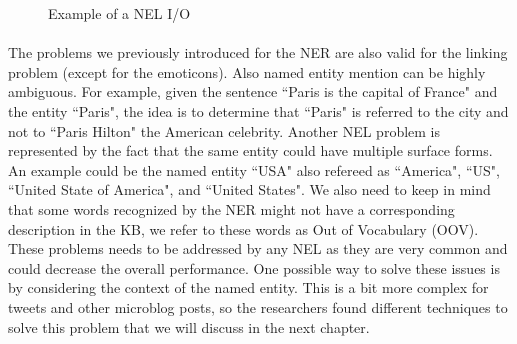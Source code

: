 \begin{figure}[ht]
\caption{Example of a NEL I/O}
\label{fig:nel_io}
\end{figure}

\paragraph{}
The problems we previously introduced for the NER are also valid for the linking problem (except for the emoticons). Also named entity mention can be highly ambiguous. For example, given the sentence ``Paris is the capital of France" and the entity ``Paris", the idea is to determine that ``Paris" is referred to the city and not to ``Paris Hilton" the American celebrity. Another NEL problem is represented by the fact that the same entity could have multiple surface forms. An example could be the named entity ``USA" also refereed as ``America", ``US", ``United State of America", and ``United States". We also need to keep in mind that some words recognized by the NER might not have a corresponding description in the KB, we refer to these words as Out of Vocabulary (OOV). These problems needs to be addressed by any NEL as they are very common and could decrease the overall performance. One possible way to solve these issues is by considering the context of the named entity. This is a bit more complex for tweets and other microblog posts, so the researchers found different techniques to solve this problem that we will discuss in the next chapter.
